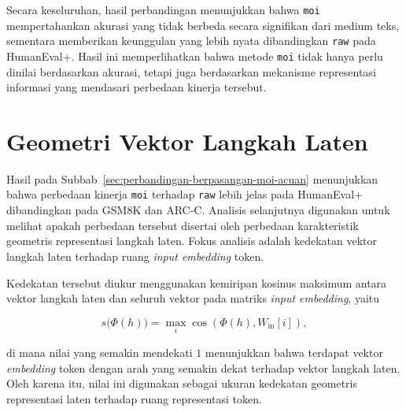 Secara keseluruhan, hasil perbandingan menunjukkan bahwa \texttt{moi}
mempertahankan akurasi yang tidak berbeda secara signifikan dari medium teks,
sementara memberikan keunggulan yang lebih nyata dibandingkan \texttt{raw}
pada HumanEval+. Hasil ini memperlihatkan bahwa metode \texttt{moi} tidak
hanya perlu dinilai berdasarkan akurasi, tetapi juga berdasarkan mekanisme
representasi informasi yang mendasari perbedaan kinerja tersebut.

\section{Geometri Vektor Langkah Laten}
\label{sec:geometri-vektor-langkah-laten}

Hasil pada Subbab~\ref{sec:perbandingan-berpasangan-moi-acuan} menunjukkan
bahwa perbedaan kinerja \texttt{moi} terhadap \texttt{raw} lebih jelas pada
HumanEval+ dibandingkan pada GSM8K dan ARC-C. Analisis selanjutnya digunakan
untuk melihat apakah perbedaan tersebut disertai oleh perbedaan karakteristik
geometris representasi langkah laten. Fokus analisis adalah kedekatan vektor
langkah laten terhadap ruang \textit{input embedding} token.

Kedekatan tersebut diukur menggunakan kemiripan kosinus maksimum antara vektor
langkah laten dan seluruh vektor pada matriks \textit{input embedding}, yaitu

\begin{equation}
    s\bigl(\Phi(h)\bigr)
    =
    \max_i
    \cos\left(
    \Phi(h),W_{\mathrm{in}}[i]
    \right),
    \label{eq:geometri-cosine}
\end{equation}

di mana nilai yang semakin mendekati $1$ menunjukkan bahwa terdapat vektor
\textit{embedding} token dengan arah yang semakin dekat terhadap vektor langkah
laten. Oleh karena itu, nilai ini digunakan sebagai ukuran kedekatan geometris
representasi laten terhadap ruang representasi token.


